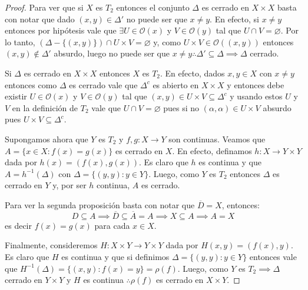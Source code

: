 \documentclass{article}
\theoremstyle{definition}
\newcommand{\cl}[1]{\overline{#1}}              %
\begin{document}
\begin{proof}
    Para ver que si \( X \) es \( T_2 \) entonces el conjunto \( \Delta \) es cerrado en \( X \times X \)
    basta con notar que dado \( (x, y) \in \Delta' \) no puede ser que \( x \neq y \). En efecto, si \( x \neq y \)
    entonces por hipótesis vale que \( \exists U \in \mathcal{O}(x) \) y \( V \in \mathcal{O}(y) \) tal que \( U \cap V = \varnothing \).
    Por lo tanto, \( (\Delta - \{ (x, y) \}) \cap U \times V = \varnothing \) y, como \( U \times V \in \mathcal{O}((x, y)) \) entonces
    \( (x, y) \notin \Delta' \) absurdo, luego no puede ser que \( x \neq y \therefore \Delta' \subseteq \Delta \implies \Delta \) cerrado.

    Si \( \Delta \) es cerrado en \( X \times X \) entonces \( X \) es \( T_2 \). En efecto, dados \( x, y \in X \) con \( x \neq y \)
    entonces como \( \Delta \) es cerrado vale que \( \Delta^c \) es abierto en \( X \times X \) y entonces debe existir \( U \in \mathcal{O}(x) \)
    y \( V \in \mathcal{O}(y) \) tal que \( (x, y) \in U \times V \subseteq \Delta^c \) y usando estos \( U \) y \( V \) en la definición de \( T_2 \)
    vale que \( U \cap V = \varnothing \) pues si no \( (\alpha, \alpha) \in U \times V \) absurdo pues \( U \times V \subseteq \Delta^c \).

    Supongamos ahora que \( Y \) es \( T_2 \) y \( f, g : X \to Y \) son continuas. Veamos que \( A = \{ x \in X : f(x) = g(x) \} \)
    es cerrado en  \( X \). En efecto, definamos \( h: X \to Y \times Y \) dada por \( h(x) = (f(x), g(x)) \). Es claro que \( h \) es continua
    y que \( A = h^{-1}(\Delta) \) con \( \Delta = \{ (y, y) : y \in Y \} \). Luego, como \( Y \) es \( T_2 \) entonces \( \Delta \) es cerrado en \( Y \) y, por ser \( h \) continua, \( A \) es cerrado.

    Para ver la segunda proposición basta con notar que \( \overline{D} = X \), entonces:\[
        D \subseteq A \implies \overline{D} \subseteq \cl{A} = A \implies X \subseteq A \implies A = X
    \] es decir \( f(x) = g(x) \) para cada \( x \in X \).

    Finalmente, consideremos \( H: X \times Y \to Y \times Y \) dada por \( H(x, y) = (f(x), y) \). Es claro que \( H \) es continua y que
    si definimos \( \Delta = \{ (y, y) : y \in Y \} \) entonces vale que \( H^{-1}(\Delta) = \{ (x, y) : f(x) = y \} = \rho(f) \). Luego,
    como \( Y \) es \( T_2 \implies \Delta \) cerrado en \( Y \times Y \) y \( H \) es continua \( \therefore \rho(f) \) es cerrado en \( X \times Y \).
\end{proof}
\end{document}
